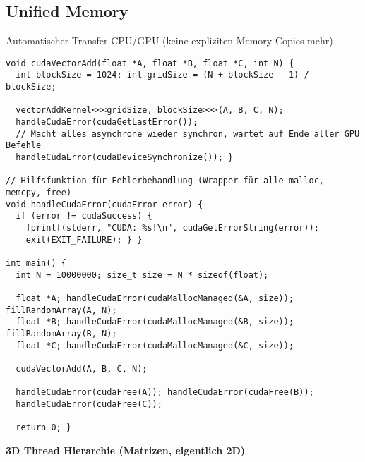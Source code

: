 \subsection{Unified Memory}
Automatischer Transfer CPU/GPU (keine expliziten Memory Copies mehr)
\begin{lstlisting}
void cudaVectorAdd(float *A, float *B, float *C, int N) {
  int blockSize = 1024; int gridSize = (N + blockSize - 1) / blockSize;

  vectorAddKernel<<<gridSize, blockSize>>>(A, B, C, N);
  handleCudaError(cudaGetLastError());
  // Macht alles asynchrone wieder synchron, wartet auf Ende aller GPU Befehle
  handleCudaError(cudaDeviceSynchronize()); }

// Hilfsfunktion für Fehlerbehandlung (Wrapper für alle malloc, memcpy, free)
void handleCudaError(cudaError error) {
  if (error != cudaSuccess) {
  	fprintf(stderr, "CUDA: %s!\n", cudaGetErrorString(error));
  	exit(EXIT_FAILURE); } }

int main() {
  int N = 10000000; size_t size = N * sizeof(float);

  float *A; handleCudaError(cudaMallocManaged(&A, size)); fillRandomArray(A, N);
  float *B; handleCudaError(cudaMallocManaged(&B, size)); fillRandomArray(B, N);
  float *C; handleCudaError(cudaMallocManaged(&C, size));

  cudaVectorAdd(A, B, C, N);

  handleCudaError(cudaFree(A)); handleCudaError(cudaFree(B));
  handleCudaError(cudaFree(C));

  return 0; }
\end{lstlisting}

\textbf{3D Thread Hierarchie (Matrizen, eigentlich 2D)}

